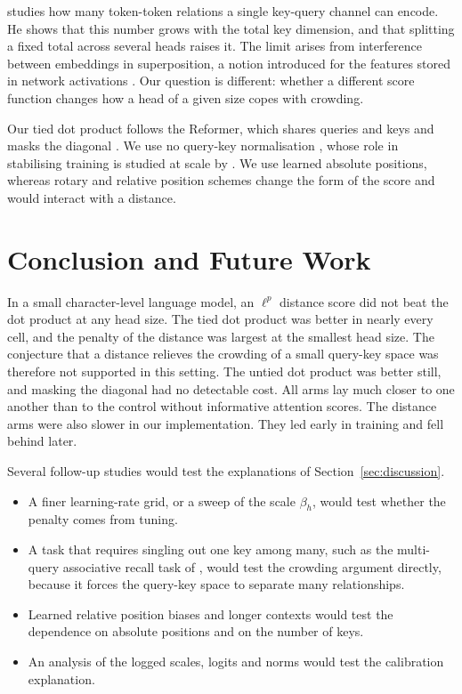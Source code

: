\documentclass[11pt]{article}
\begin{document}
\citet{adler2026} studies how many token-token relations a single key-query channel can encode.
He shows that this number grows with the total key dimension, and that splitting a fixed total across several heads raises it.
The limit arises from interference between embeddings in superposition, a notion introduced for the features stored in network activations \citep{elhage2022}.
Our question is different: whether a different score function changes how a head of a given size copes with crowding.

Our tied dot product follows the Reformer, which shares queries and keys and masks the diagonal \citep{kitaev2020reformer}.
We use no query-key normalisation \citep{henry2020}, whose role in stabilising training is studied at scale by \citet{wortsman2024small}.
We use learned absolute positions, whereas rotary and relative position schemes \citep{shaw2018,su2021} change the form of the score and would interact with a distance.

\section{Conclusion and Future Work}

In a small character-level language model, an $\ell^p$ distance score did not beat the dot product at any head size.
The tied dot product was better in nearly every cell, and the penalty of the distance was largest at the smallest head size.
The conjecture that a distance relieves the crowding of a small query-key space was therefore not supported in this setting.
The untied dot product was better still, and masking the diagonal had no detectable cost.
All arms lay much closer to one another than to the control without informative attention scores.
The distance arms were also slower in our implementation.
They led early in training and fell behind later.

Several follow-up studies would test the explanations of Section~\ref{sec:discussion}.
\begin{itemize}
\item A finer learning-rate grid, or a sweep of the scale $\beta_h$, would test whether the penalty comes from tuning.
\item A task that requires singling out one key among many, such as the multi-query associative recall task of \citet{arora2024zoology}, would test the crowding argument directly, because it forces the query-key space to separate many relationships.
\item Learned relative position biases and longer contexts would test the dependence on absolute positions and on the number of keys.
\item An analysis of the logged scales, logits and norms would test the calibration explanation.
\end{itemize}
\end{document}
